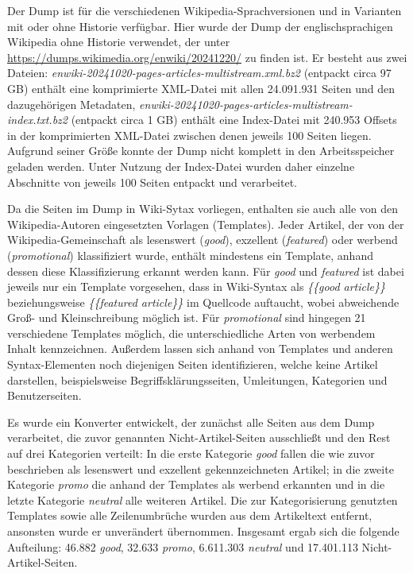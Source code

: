 Der Dump ist für die verschiedenen Wikipedia-Sprachversionen und in Varianten mit oder ohne Historie verfügbar. Hier wurde der Dump der englischsprachigen Wikipedia ohne Historie verwendet, der unter \url{https://dumps.wikimedia.org/enwiki/20241220/} zu finden ist. Er besteht aus zwei Dateien: \emph{enwiki-20241020-pages-articles-multistream.xml.bz2} (entpackt circa 97 GB) enthält eine komprimierte XML-Datei mit allen 24.091.931 Seiten und den dazugehörigen Metadaten, \emph{enwiki-20241020-pages-articles-multistream-index.txt.bz2} (entpackt circa 1 GB) enthält eine Index-Datei mit 240.953 Offsets in der komprimierten XML-Datei zwischen denen jeweils 100 Seiten liegen. Aufgrund seiner Größe konnte der Dump nicht komplett in den Arbeitsspeicher geladen werden. Unter Nutzung der Index-Datei wurden daher einzelne Abschnitte von jeweils 100 Seiten entpackt und verarbeitet.

Da die Seiten im Dump in Wiki-Sytax vorliegen, enthalten sie auch alle von den Wikipedia-Autoren eingesetzten Vorlagen (Templates). Jeder Artikel, der von der Wiki\-pedia-Gemeinschaft als lesenswert (\emph{good}), exzellent (\emph{featured}) oder werbend (\emph{promotional}) klassifiziert wurde, enthält mindestens ein Template, anhand dessen diese Klassifizierung erkannt werden kann. Für \emph{good} und \emph{featured} ist dabei jeweils nur ein Template vorgesehen, dass in Wiki-Syntax als \textit{\{\{good article\}\}} beziehungsweise \textit{\{\{featured article\}\}} im Quellcode auftaucht, wobei abweichende Groß- und Kleinschreibung möglich ist. Für \emph{promotional} sind hingegen 21 verschiedene Templates möglich, die unterschiedliche Arten von werbendem Inhalt kennzeichnen. Außerdem lassen sich anhand von Templates und anderen Syntax-Elementen noch diejenigen Seiten identifizieren, welche keine Artikel darstellen, beispielsweise Begriffsklärungsseiten, Umleitungen, Kategorien und Benutzerseiten.

Es wurde ein Konverter entwickelt, der zunächst alle Seiten aus dem Dump verarbeitet, die zuvor genannten Nicht-Artikel-Seiten ausschließt und den Rest auf drei Kategorien verteilt: In die erste Kategorie \emph{good} fallen die wie zuvor beschrieben als lesenswert und exzellent gekennzeichneten Artikel; in die zweite Kategorie \emph{promo} die anhand der Templates als werbend erkannten und in die letzte Kategorie \emph{neutral} alle weiteren Artikel. Die zur Kategorisierung genutzten Templates sowie alle Zeilenumbrüche wurden aus dem Artikeltext entfernt, ansonsten wurde er unverändert übernommen. Insgesamt ergab sich die folgende Aufteilung: 46.882 \emph{good}, 32.633 \emph{promo}, 6.611.303 \emph{neutral} und 17.401.113 Nicht-Artikel-Seiten.

